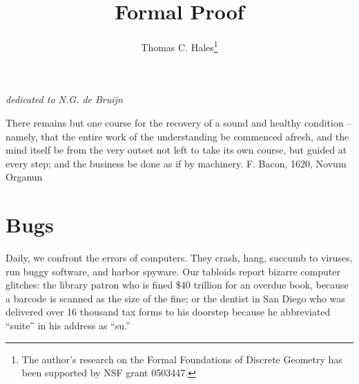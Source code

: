 \documentclass{llncs}
\begin{document}
\title{Formal Proof}%
\author{Thomas C. Hales\thanks{The author's research on the Formal Foundations of Discrete Geometry has been supported by NSF grant 0503447.}}
\maketitle


\centerline{\it dedicated to N.G. de Bruijn}


\bigskip

{\narrower\it 

There remains but one course 
for the recovery of a sound and healthy condition --
namely, that the entire work of the understanding be commenced afresh, and the mind itself be from the very outset not left to take its own course, but
guided at every step; and the business be done
as if by machinery.  F. Bacon, 1620, Novum Organun

}

\bigskip



\bigskip

\section{Bugs}

Daily, we confront the errors of computers.  They crash,
hang, succumb to viruses, run buggy software, and harbor
spyware.  Our  tabloids report bizarre computer glitches:
the library patron who is fined \$40 trillion for an overdue
book, because a  
barcode is scanned as the size of the fine; or the 
dentist in San Diego who was delivered over 16 thousand tax forms
to his doorstep because he abbreviated ``suite'' 
in his address as ``su.''
\end{document}
